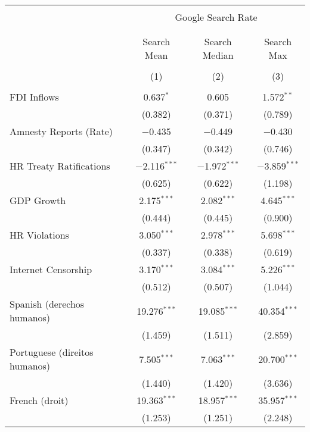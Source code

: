 
\begin{table}[!htbp] \centering 
  \caption{} 
  \label{} 
\begin{tabular}{@{\extracolsep{5pt}}lccc} 
\\[-1.8ex]\hline 
\hline \\[-1.8ex] 
 & \multicolumn{3}{c}{Google Search Rate} \\ 
\cline{2-4} 
\\[-1.8ex] & \multicolumn{3}{c}{ } \\ 
 & Search Mean & Search Median & Search Max \\ 
\\[-1.8ex] & (1) & (2) & (3)\\ 
\hline \\[-1.8ex] 
 FDI Inflows & 0.637$^{*}$ & 0.605 & 1.572$^{**}$ \\ 
  & (0.382) & (0.371) & (0.789) \\ 
  Amnesty Reports (Rate) & $-$0.435 & $-$0.449 & $-$0.430 \\ 
  & (0.347) & (0.342) & (0.746) \\ 
  HR Treaty Ratifications & $-$2.116$^{***}$ & $-$1.972$^{***}$ & $-$3.859$^{***}$ \\ 
  & (0.625) & (0.622) & (1.198) \\ 
  GDP Growth & 2.175$^{***}$ & 2.082$^{***}$ & 4.645$^{***}$ \\ 
  & (0.444) & (0.445) & (0.900) \\ 
  HR Violations & 3.050$^{***}$ & 2.978$^{***}$ & 5.698$^{***}$ \\ 
  & (0.337) & (0.338) & (0.619) \\ 
  Internet Censorship & 3.170$^{***}$ & 3.084$^{***}$ & 5.226$^{***}$ \\ 
  & (0.512) & (0.507) & (1.044) \\ 
  Spanish (derechos humanos) & 19.276$^{***}$ & 19.085$^{***}$ & 40.354$^{***}$ \\ 
  & (1.459) & (1.511) & (2.859) \\ 
  Portuguese (direitos humanos) & 7.505$^{***}$ & 7.063$^{***}$ & 20.700$^{***}$ \\ 
  & (1.440) & (1.420) & (3.636) \\ 
  French (droit) & 19.363$^{***}$ & 18.957$^{***}$ & 35.957$^{***}$ \\ 
  & (1.253) & (1.251) & (2.248) \\ 

\end{tabular}
\end{table}
